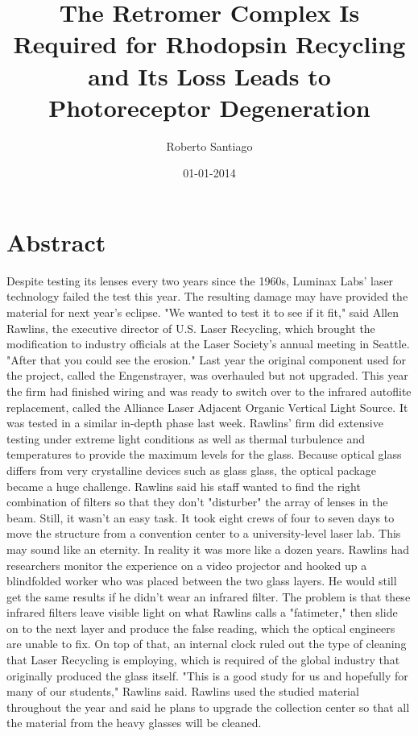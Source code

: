 \documentclass{article}%
\title{The Retromer Complex Is Required for Rhodopsin Recycling and Its Loss Leads to Photoreceptor Degeneration}%
\author{Roberto Santiago}%
\affil{Institute of Neurological Sciences and Psychiatry, Hacettepe University, Ankara 06100, Turkey.}%
\date{01{-}01{-}2014}%
\begin{document}
%
\normalsize%
\maketitle%
\section{Abstract}%
\label{sec:Abstract}%
Despite testing its lenses every two years since the 1960s, Luminax Labs' laser technology failed the test this year. The resulting damage may have provided the material for next year's eclipse.\newline%
"We wanted to test it to see if it fit," said Allen Rawlins, the executive director of U.S. Laser Recycling, which brought the modification to industry officials at the Laser Society's annual meeting in Seattle. "After that you could see the erosion."\newline%
Last year the original component used for the project, called the Engenstrayer, was overhauled but not upgraded. This year the firm had finished wiring and was ready to switch over to the infrared autoflite replacement, called the Alliance Laser Adjacent Organic Vertical Light Source. It was tested in a similar in{-}depth phase last week. Rawlins' firm did extensive testing under extreme light conditions as well as thermal turbulence and temperatures to provide the maximum levels for the glass.\newline%
Because optical glass differs from very crystalline devices such as glass glass, the optical package became a huge challenge. Rawlins said his staff wanted to find the right combination of filters so that they don't "disturber" the array of lenses in the beam. Still, it wasn't an easy task. It took eight crews of four to seven days to move the structure from a convention center to a university{-}level laser lab. This may sound like an eternity. In reality it was more like a dozen years. Rawlins had researchers monitor the experience on a video projector and hooked up a blindfolded worker who was placed between the two glass layers. He would still get the same results if he didn't wear an infrared filter.\newline%
The problem is that these infrared filters leave visible light on what Rawlins calls a "fatimeter," then slide on to the next layer and produce the false reading, which the optical engineers are unable to fix.\newline%
On top of that, an internal clock ruled out the type of cleaning that Laser Recycling is employing, which is required of the global industry that originally produced the glass itself.\newline%
"This is a good study for us and hopefully for many of our students," Rawlins said.\newline%
Rawlins used the studied material throughout the year and said he plans to upgrade the collection center so that all the material from the heavy glasses will be cleaned.
\end{document}
